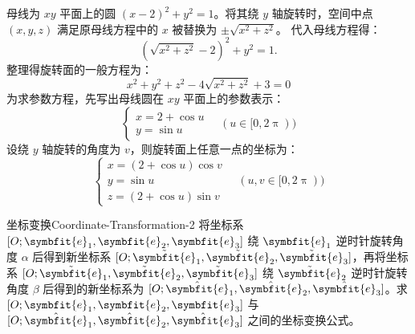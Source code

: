 \begin{solution}
    母线为 $xy$ 平面上的圆 $(x - 2)^2 + y^2 = 1$。将其绕 $y$ 轴旋转时，空间中点 $(x, y, z)$ 满足原母线方程中的 $x$ 被替换为 $\pm \sqrt{x^2 + z^2}$。
    代入母线方程得：
    \begin{equation*}
        (\sqrt{x^2 + z^2} - 2)^2 + y^2 = 1.
    \end{equation*}
    整理得旋转面的一般方程为：
    \begin{equation*}
        \boxed{x^2 + y^2 + z^2 - 4\sqrt{x^2 + z^2} + 3 = 0}
    \end{equation*}
    为求参数方程，先写出母线圆在 $xy$ 平面上的参数表示：
    \begin{equation*}
        \begin{cases}
            x = 2 + \cos u \\
            y = \sin u
        \end{cases} \quad (u \in [0, 2\uppi))
    \end{equation*}
    设绕 $y$ 轴旋转的角度为 $v$，则旋转面上任意一点的坐标为：
    \begin{equation*}
        \boxed{\begin{cases}
            x = (2 + \cos u) \cos v \\
            y = \sin u              \\
            z = (2 + \cos u) \sin v
        \end{cases} \quad (u, v \in [0, 2\uppi))}
    \end{equation*}
\end{solution}


\begin{problem}{坐标变换}{Coordinate-Transformation-2}
    将坐标系 $[O; \symbfit{e}_1, \symbfit{e}_2, \symbfit{e}_3]$ 绕 $\symbfit{e}_1$ 逆时针旋转角度 $\alpha$ 后得到新坐标系 $[O; \tilde{\symbfit{e}}_1, \tilde{\symbfit{e}}_2, \tilde{\symbfit{e}}_3]$，再将坐标系 $[O; \tilde{\symbfit{e}}_1, \tilde{\symbfit{e}}_2, \tilde{\symbfit{e}}_3]$ 绕 $\tilde{\symbfit{e}}_2$ 逆时针旋转角度 $\beta$ 后得到的新坐标系为 $[O; \hat{\symbfit{e}}_1, \hat{\symbfit{e}}_2, \hat{\symbfit{e}}_3]$。求 $[O; \symbfit{e}_1, \symbfit{e}_2, \symbfit{e}_3]$ 与 $[O; \hat{\symbfit{e}}_1, \hat{\symbfit{e}}_2, \hat{\symbfit{e}}_3]$ 之间的坐标变换公式。
\end{problem}


